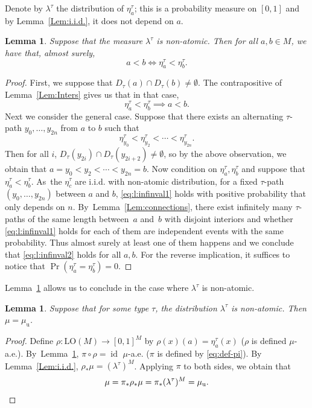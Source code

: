 \documentclass[JEP,XML,SOM,Unicode,published]{cedram}
\theoremstyle{plain}
\newtheorem{lemma}[theorem]{Lemma}
\theoremstyle{definition}
\DeclareMathOperator{\id}{id}
\newcommand{\LO}{\mathrm{LO}}
\newcommand{\muu}{\mu_{\mathrm{u}}}
\begin{document}
Denote by $\lambda^\tau$ the distribution of $\eta^\tau_a$; this is a probability measure on $[0, 1]$ and by Lemma~\ref{Lem:i.i.d.}, it does not depend on $a$.
\begin{lemma}
\label{Lem:atomless}
Suppose that the measure $\lambda^\tau$ is non-atomic. Then for all $a, b \in M$, we have that, almost surely,
\begin{equation*}
a < b \iff \eta^\tau_a < \eta^\tau_b.
\end{equation*}
\end{lemma}
\begin{proof}
First, we suppose that $D_\tau (a) \cap D_\tau (b) \neq \emptyset$. The contrapositive of Lemma~\ref{Lem:Inters} gives us that in that case,
\begin{equation}
\label{eq:l:infinval2}
\eta_a^\tau < \eta_b^\tau \implies a < b.
\end{equation}
Next we consider the general case. Suppose that there exists an alternating $\tau$-path $y_0, \ldots, y_{2n}$ from $a$ to $b$ such that
\begin{equation}
\label{eq:l:infinval1}
\eta^\tau_{y_0} < \eta^\tau_{y_2} < \cdots < \eta^\tau_{y_{2n}}.
\end{equation}
Then for all $i$, $D_\tau(y_{2i}) \cap D_\tau(y_{2i+2}) \neq \emptyset$, so by the above observation, we obtain that $a = y_0 < y_2 < \cdots < y_{2n} = b$. Now condition on $\eta^\tau_a, \eta^\tau_b$ and suppose that $\eta^\tau_a < \eta^\tau_b$. As~the $\eta^\tau_c$ are i.i.d. with non-atomic distribution, for a fixed $\tau$-path $(y_0, \ldots, y_{2n})$ between $a$ and $b$, \eqref{eq:l:infinval1} holds with positive probability that only depends on $n$. By~Lemma~\ref{Lem:connections}, there exist infinitely many $\tau$-paths of the same length between~$a$ and~$b$ with disjoint interiors and whether \eqref{eq:l:infinval1} holds for each of them are independent events with the same probability. Thus almost surely at least one of them happens and we conclude that \eqref{eq:l:infinval2} holds for all $a, b$. For the reverse implication, it suffices to notice that $\Pr(\eta^\tau_a = \eta^\tau_b) = 0$.
\end{proof}

Lemma~\ref{Lem:atomless} allows us to conclude in the case where $\lambda^\tau$ is non-atomic.
\begin{lemma}
\label{l:non-atomic}
Suppose that for some type $\tau$, the distribution $\lambda^\tau$ is non-atomic. Then $\mu = \muu$.
\end{lemma}
\begin{proof}
Define $\rho \colon \LO(M) \to [0, 1]^M$ by $\rho(x)(a) = \eta^\tau_a(x)$ ($\rho$ is defined $\mu$-a.e.). By~Lemma~\ref{Lem:atomless}, $\pi \circ \rho = \id$ $\mu$-a.e. ($\pi$ is defined by \eqref{eq:def-pi}). By Lemma~\ref{Lem:i.i.d.}, $\rho_* \mu = (\lambda^\tau)^M$. Applying $\pi$ to both sides, we obtain that
\begin{equation*}
\mu = \pi_* \rho_* \mu = \pi_*(\lambda^\tau)^M = \muu. \qedhere
\end{equation*}
\end{proof}
\end{document}
